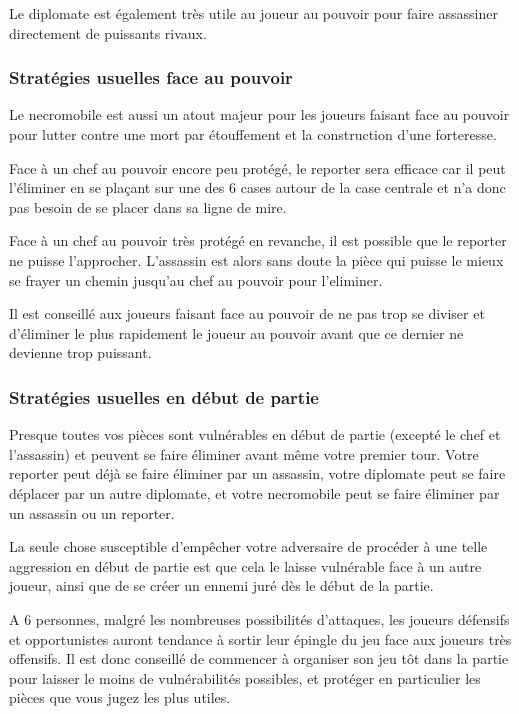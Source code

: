 \documentclass{article}
\begin{document}
Le diplomate est également très utile au joueur au pouvoir pour faire assassiner directement de puissants rivaux.


\subsubsection{Stratégies usuelles face au pouvoir}

Le necromobile est aussi un atout majeur pour les joueurs faisant face au pouvoir pour lutter contre une mort par étouffement et la construction d'une forteresse.

Face à un chef au pouvoir encore peu protégé, le reporter sera efficace car il peut l'éliminer en se plaçant sur une des 6 cases autour de la case centrale et n'a donc pas besoin de se placer dans sa ligne de mire.

Face à un chef au pouvoir très protégé en revanche, il est possible que le reporter ne puisse l'approcher. 
L'assassin est alors sans doute la pièce qui puisse le mieux se frayer un chemin jusqu'au chef au pouvoir pour l'eliminer.

Il est conseillé aux joueurs faisant face au pouvoir de ne pas trop se diviser et d'éliminer le plus rapidement le joueur au pouvoir avant que ce dernier ne devienne trop puissant.

\subsubsection{Stratégies usuelles en début de partie}

Presque toutes vos pièces sont vulnérables en début de partie (excepté le chef et l'assassin) et peuvent se faire éliminer avant même votre premier tour.
Votre reporter peut déjà se faire éliminer par un assassin, votre diplomate peut se faire déplacer par un autre diplomate, et votre necromobile peut se faire éliminer par un assassin ou un reporter.

La seule chose susceptible d'empêcher votre adversaire de procéder à une telle aggression en début de partie est que cela le laisse vulnérable face à un autre joueur, ainsi que de se créer un ennemi juré dès le début de la partie.

A 6 personnes, malgré les nombreuses possibilités d'attaques, les joueurs défensifs et opportunistes auront tendance à sortir leur épingle du jeu face aux joueurs très offensifs.
Il est donc conseillé de commencer à organiser son jeu tôt dans la partie pour laisser le moins de vulnérabilités possibles, et protéger en particulier les pièces que vous jugez les plus utiles.
\end{document}
